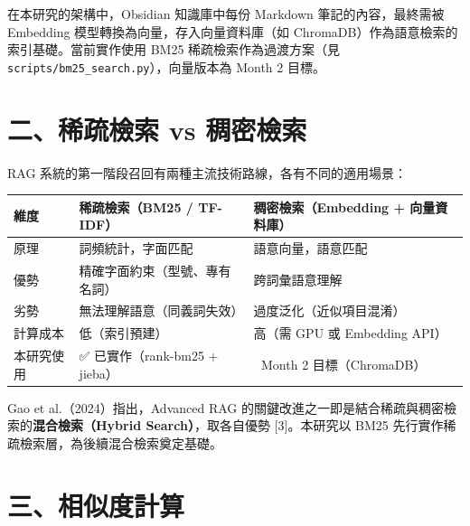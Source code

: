在本研究的架構中，Obsidian 知識庫中每份 Markdown 筆記的內容，最終需被
Embedding 模型轉換為向量，存入向量資料庫（如
ChromaDB）作為語意檢索的索引基礎。當前實作使用 BM25
稀疏檢索作為過渡方案（見 \texttt{scripts/bm25\_search.py}），向量版本為
Month 2 目標。

\section{二、稀疏檢索 vs
稠密檢索}\label{ux4e8cux7a00ux758fux6aa2ux7d22-vs-ux7a20ux5bc6ux6aa2ux7d22}

RAG 系統的第一階段召回有兩種主流技術路線，各有不同的適用場景：

{\def\LTcaptype{none} %
\begin{longtable}[]{@{}
  >{\raggedright\arraybackslash}p{}
  >{\raggedright\arraybackslash}p{}
  >{\raggedright\arraybackslash}p{}@{}}
\toprule\noalign{}
\begin{minipage}[b]{\linewidth}\raggedright
維度
\end{minipage} & \begin{minipage}[b]{\linewidth}\raggedright
稀疏檢索（BM25 / TF-IDF）
\end{minipage} & \begin{minipage}[b]{\linewidth}\raggedright
稠密檢索（Embedding + 向量資料庫）
\end{minipage} \\
\midrule\noalign{}
\endhead
\bottomrule\noalign{}
\endlastfoot
原理 & 詞頻統計，字面匹配 & 語意向量，語意匹配 \\
優勢 & 精確字面約束（型號、專有名詞） & 跨詞彙語意理解 \\
劣勢 & 無法理解語意（同義詞失效） & 過度泛化（近似項目混淆） \\
計算成本 & 低（索引預建） & 高（需 GPU 或 Embedding API） \\
本研究使用 & ✅ 已實作（rank-bm25 + jieba） & 🔲 Month 2
目標（ChromaDB） \\
\end{longtable}
}

Gao et al.（2024）指出，Advanced RAG
的關鍵改進之一即是結合稀疏與稠密檢索的\textbf{混合檢索（Hybrid
Search）}，取各自優勢 {[}3{]}。本研究以 BM25
先行實作稀疏檢索層，為後續混合檢索奠定基礎。

\section{三、相似度計算}\label{ux4e09ux76f8ux4f3cux5ea6ux8a08ux7b97}

